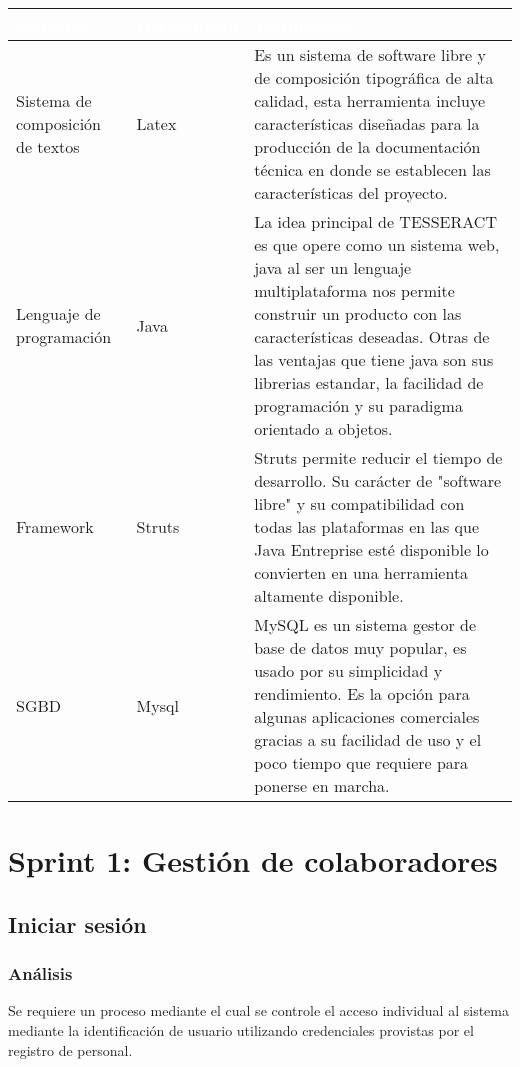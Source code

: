 \begin{table}[H]
	\centering
	\begin{tabular}{|p{3cm}|p{3cm}|p{6cm}|}
		\hline
		\rowcolor{black} \textcolor{white} {\textbf{Elemento}} & \textcolor{white}{\textbf{Herramienta}} & \textcolor{white}{\textbf{Justificación}}  \\ \hline
		Sistema de composición de textos & Latex & Es un sistema de software libre y de composición tipográfica de alta calidad, esta herramienta incluye características diseñadas para la producción de la documentación técnica en donde se establecen las características del proyecto. \\
		\hline
		Lenguaje de programación & Java & La idea principal de TESSERACT es que opere como un sistema web, java al ser un lenguaje multiplataforma nos permite construir un producto con las características deseadas. Otras de las ventajas que tiene java son sus librerias estandar, la facilidad de programación y su paradigma orientado a objetos. \\
		\hline
		Framework & Struts & Struts permite reducir el tiempo de desarrollo. Su carácter de "software libre" y su compatibilidad con todas las plataformas en las que Java Entreprise esté disponible lo convierten en una herramienta altamente disponible. \\
		\hline
		SGBD & Mysql & MySQL es un sistema gestor de base de datos muy popular, es usado por su simplicidad y rendimiento. Es la opción para algunas aplicaciones comerciales gracias a su facilidad de uso y el poco tiempo que requiere para ponerse en marcha.  \\
		\hline
	\end{tabular}
\end{table}
\newpage

\section{Sprint 1: Gestión de colaboradores}

\subsection{Iniciar sesión}
\subsubsection {Análisis}
Se requiere un proceso mediante el cual se controle el acceso individual al sistema mediante la identificación de usuario utilizando credenciales provistas por el registro de personal.\\

